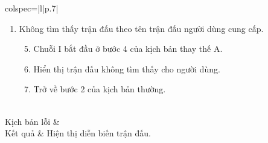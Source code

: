 \documentclass{article}
\begin{document}
\begin{longtblr}[caption = {Đặc tả usecase Xem diễn biến trận đấu loại},
label = {tab:usecase1-spec},]{colspec={|l|p{.7\linewidth}|}}
\begin{minipage}{\linewidth}
\begin{enumerate}[label={\textbf{\textcolor{red}{A\arabic*}} --}, align=left, itemsep=-5pt]
       \item Không tìm thấy trận đấu theo tên trận đấu người dùng cung cấp. \\
            \vspace{-1.5em}
            \begin{enumerate}[leftmargin=-5px, align=left, label=\arabic*.]
              \setcounter{enumii}{4}
              \item[]
                    \hspace{-25px} Chuỗi I bắt đầu ở bước 4 của kịch bản thay thế A.
              \item Hiển thị trận đấu không tìm thấy cho người dùng.
              \item[]
                    \hspace{-25px} Trở về bước 2 của kịch bản thường.
            \end{enumerate}
    \end{enumerate}
    \vskip 1pt

\end{minipage}
\\\hline
Kịch bản lỗi & \\\hline
Kết quả & Hiện thị diễn biến trận đấu. \\\hline
\end{longtblr}
\end{document}
